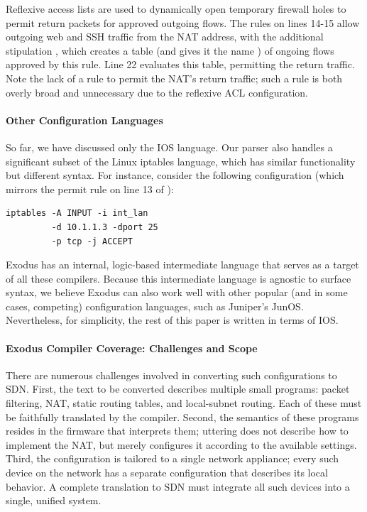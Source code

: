 Reflexive access lists are used to dynamically open temporary
firewall holes to permit return packets for approved outgoing flows.
The rules on lines 14-15 allow outgoing
web and SSH traffic from the NAT address, with the additional stipulation ,
which creates a table (and gives it the name ) of ongoing
flows approved by this rule. Line 22 evaluates this table, permitting the return
traffic. Note the lack of a  rule to permit the NAT's return traffic; such a
rule is both overly broad and unnecessary due to the reflexive ACL configuration.


\paragraph{Other Configuration Languages}

So far, we have discussed only the IOS language. Our parser also
handles a significant subset of the Linux iptables language, which has
similar functionality but different syntax. For instance, consider the
following configuration (which mirrors the permit rule on line 13 of ):

\begin{lstlisting}[label=lst:iptables,language=IOS]
iptables -A INPUT -i int_lan 
         -d 10.1.1.3 -dport 25 
         -p tcp -j ACCEPT
\end{lstlisting}

\noindent
Exodus has an internal, logic-based intermediate language that serves
as a target of all these compilers. Because this intermediate language
is agnostic to surface syntax, we believe Exodus can also work
well with other popular (and in some cases, competing) configuration
languages, such as Juniper's JunOS. Nevertheless, for simplicity, the
rest of this paper is written in terms of IOS.

\paragraph{Exodus Compiler Coverage: Challenges and Scope}

There are numerous challenges involved in converting such configurations to
SDN. First, the text to be converted describes multiple small programs: packet
filtering, NAT, static routing tables, and local-subnet routing. Each of these must
be faithfully translated by the compiler. Second, the semantics of these
programs resides in the firmware that interprets them; uttering  does not describe how to implement the NAT, but merely configures it
according to the available settings. Third, the configuration is tailored to
a single network appliance; every such device on the network has a separate
configuration that describes its local behavior. A complete translation to SDN must
integrate all such devices into a single, unified system.

